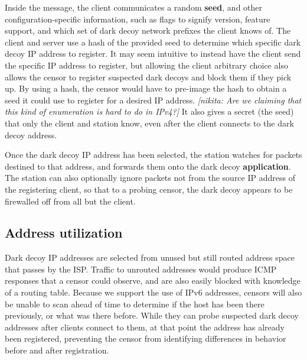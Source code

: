 \documentclass[letterpaper,twocolumn,10pt]{article}
\newcommand{\note}[2]{\textit{[#1: #2]}}
\newcommand{\nikita}[1]{\note{nikita}{#1}}
\begin{document}
Inside the message, the client communicates a random \textbf{seed}, and other
configuration-specific information, such as flags to signify version, feature
support, and which set of dark decoy network prefixes the client knows of. The
client and server use a hash of the provided seed to determine which specific
dark decoy IP address to register. It may seem intuitive to instead have the client
send the specific IP address to register, but allowing the client arbitrary
choice also allows the censor to register suspected dark decoys and block them if
they pick up. By using a hash, the censor would have to pre-image the hash to
obtain a seed it could use to register for a desired IP address. \nikita{Are we claiming that this kind of enumeration is hard to do in IPv4?} It also gives a
secret (the seed) that only the client and station know, even after the client
connects to the dark decoy address.

Once the dark decoy IP address has been selected, the station watches for
packets destined to that address, and forwards them onto the dark decoy
\textbf{application}. The station can also optionally ignore packets not from
the source IP address of the registering client, so that to a probing censor,
the dark decoy appears to be firewalled off from all but the client.


\subsection{Address utilization}

Dark decoy IP addresses are selected from unused but still routed address
space that passes by the ISP. Traffic to unrouted addresses would produce ICMP
responses that a censor could observe, and are also easily blocked with knowledge
of a routing table. Because we support the use of IPv6 addresses, censors will
also be unable to scan ahead of time to determine if the host has been there
previously, or what was there before. While they can probe suspected dark decoy
addresses after clients connect to them, at that point the address has already been
registered, preventing the censor from identifying differences in behavior
before and after registration.
\end{document}
